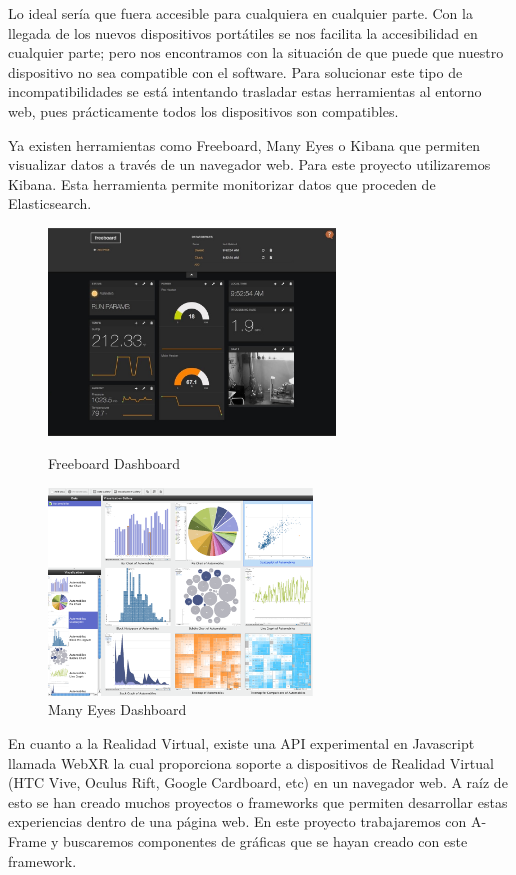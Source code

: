 \documentclass[a4paper, 12pt]{book}
\begin{document}
Lo ideal sería que fuera accesible para cualquiera en cualquier parte. Con la llegada de los nuevos dispositivos portátiles se nos facilita la accesibilidad en cualquier parte; pero nos encontramos con la situación de que puede que nuestro dispositivo no sea compatible con el software. Para solucionar este tipo de incompatibilidades se está intentando trasladar estas herramientas al entorno web, pues prácticamente todos los dispositivos son compatibles.

Ya existen herramientas como Freeboard, Many Eyes o Kibana que permiten visualizar datos a través de un navegador web. Para este proyecto utilizaremos Kibana. Esta herramienta permite monitorizar datos que proceden de Elasticsearch.

\begin{figure}[H]
  \centering
      \includegraphics[height=5.5cm, keepaspectratio]{img/development/freeboard.jpg}
      \caption{Freeboard Dashboard}
      \label{fig:freeboard}
      \endminipage\hfill
      \includegraphics[height=5.5cm, keepaspectratio]{img/development/manyeyes.png}
      \caption{Many Eyes Dashboard}
      \label{fig:manyeyes}
      \endminipage\hfill
\end{figure}


En cuanto a la Realidad Virtual, existe una API experimental en Javascript llamada WebXR la cual proporciona soporte a dispositivos de Realidad Virtual (HTC Vive, Oculus Rift, Google Cardboard, etc) en un navegador web. A raíz de esto se han creado muchos proyectos o frameworks que permiten desarrollar estas experiencias dentro de una página web. En este proyecto trabajaremos con A-Frame y buscaremos componentes de gráficas que se hayan creado con este framework.
\end{document}

